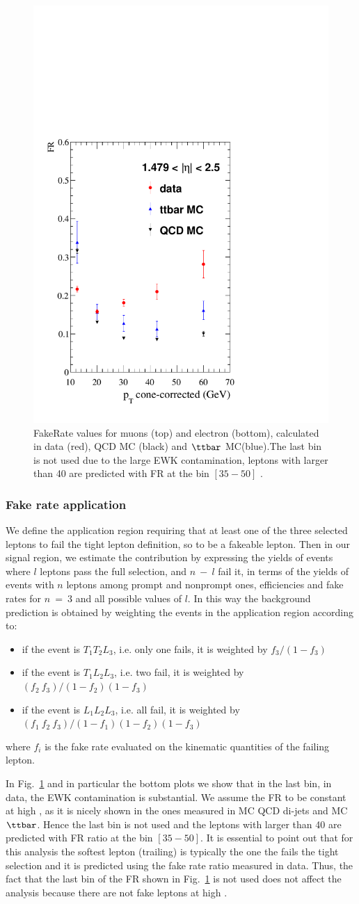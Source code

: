 \begin{figure}[h!]
\includegraphics[width=.23\textwidth]{Figures/c5/FAKE/ele3.pdf}
\caption{FakeRate values for muons (top) and electron (bottom), calculated in data (red), QCD MC (black) and $\ttbar$ MC(blue).The last bin is not used due to the large EWK contamination, leptons with \pt larger than 40 \GeV are predicted with FR at the bin $[35-50]$ \GeV.}
\label{fig:comparison_muon}
\end{figure}

\subsubsection{Fake rate application}
We define the application region requiring that at least one of the three selected leptons to fail the tight lepton definition, so to be a fakeable lepton. Then in our signal region, we estimate the contribution by expressing the yields of events where $l$ leptons pass the full selection, and $n \ - \ l$ fail it, in terms of the yields of events with $n$ leptons among prompt and nonprompt ones, efficiencies and fake rates for $n \ = \ 3$ and all possible values of $l$. In this way the background prediction is obtained by weighting the events in the application region according to:
\begin{itemize}
\item if the event is $T_{1}T_{2}L_{3}$, i.e. only one fails, it is weighted by $f_{3}/(1-f_{3})$
\item if the event is $T_{1}L_{2}L_{3}$, i.e. two fail, it is weighted by $(f_{2} \ f_{3})/(1-f_{2})(1-f_{3})$
\item if the event is $L_{1}L_{2}L_{3}$, i.e. all fail, it is weighted by $(f_{1} \ f_{2} \ f_{3})/(1-f_{1})(1-f_{2})(1-f_{3})$
\end{itemize}
where $f_{i}$ is the fake rate evaluated on the kinematic quantities
of the failing lepton.

In Fig.~\ref{fig:comparison_muon} and in particular the bottom plots we show that in the last bin, in data, the EWK contamination is substantial. We assume the FR to be constant at high \pt, as it is nicely shown in the ones measured in MC QCD di-jets and MC $\ttbar$. Hence the last bin is not used and the leptons with \pt larger than 40 \GeV are predicted with FR ratio at the bin $[35-50]$\GeV.
It is essential to point out that for this analysis the softest lepton (trailing) is typically the one the fails the tight selection and it is predicted using the fake rate ratio measured in data. Thus, the fact that the last bin of the FR shown in Fig.~\ref{fig:comparison_muon} is not used does not affect the analysis because there are not fake leptons at high \pt. 


